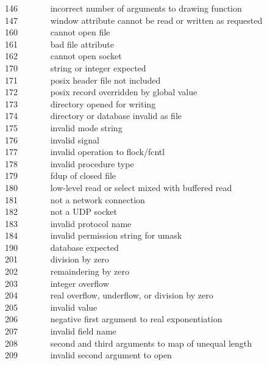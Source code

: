 146 \ \ \ \ \ \ \ incorrect number of arguments to drawing
function\\
147 \ \ \ \ \ \ \ window attribute cannot be read or written as
requested\\
160 \ \ \ \ \ \ \ cannot open file\\
161 \ \ \ \ \ \ \ bad file attribute\\
162 \ \ \ \ \ \ \ cannot open socket\\
170 \ \ \ \ \ \ \ string or integer expected\\
171 \ \ \ \ \ \ \ posix header file not included\\
172 \ \ \ \ \ \ \ posix record overridden by global value\\
173 \ \ \ \ \ \ \ directory opened for writing\\
174 \ \ \ \ \ \ \ directory or database invalid as file\\
175 \ \ \ \ \ \ \ invalid mode string\\
176 \ \ \ \ \ \ \ invalid signal\\
177 \ \ \ \ \ \ \ invalid operation to flock/fcntl\\
178 \ \ \ \ \ \ \ invalid procedure type\\
179 \ \ \ \ \ \ \ fdup of closed file\\
180 \ \ \ \ \ \ \ low-level read or select mixed with buffered
read\\
181 \ \ \ \ \ \ \ not a network connection\\
182 \ \ \ \ \ \ \ not a UDP socket\\
183 \ \ \ \ \ \ \ invalid protocol name\\
184 \ \ \ \ \ \ \ invalid permission string for umask\\
190 \ \ \ \ \ \ \ database expected\\
201 \ \ \ \ \ \ \ division by zero\\
202 \ \ \ \ \ \ \ remaindering by zero\\
203 \ \ \ \ \ \ \ integer overflow\\
204 \ \ \ \ \ \ \ real overflow, underflow, or division by zero\\
205 \ \ \ \ \ \ \ invalid value\\
206 \ \ \ \ \ \ \ negative first argument to real exponentiation\\
207 \ \ \ \ \ \ \ invalid field name\\
208 \ \ \ \ \ \ \ second and third arguments to map of unequal
length\\
209 \ \ \ \ \ \ \ invalid second argument to open\\
